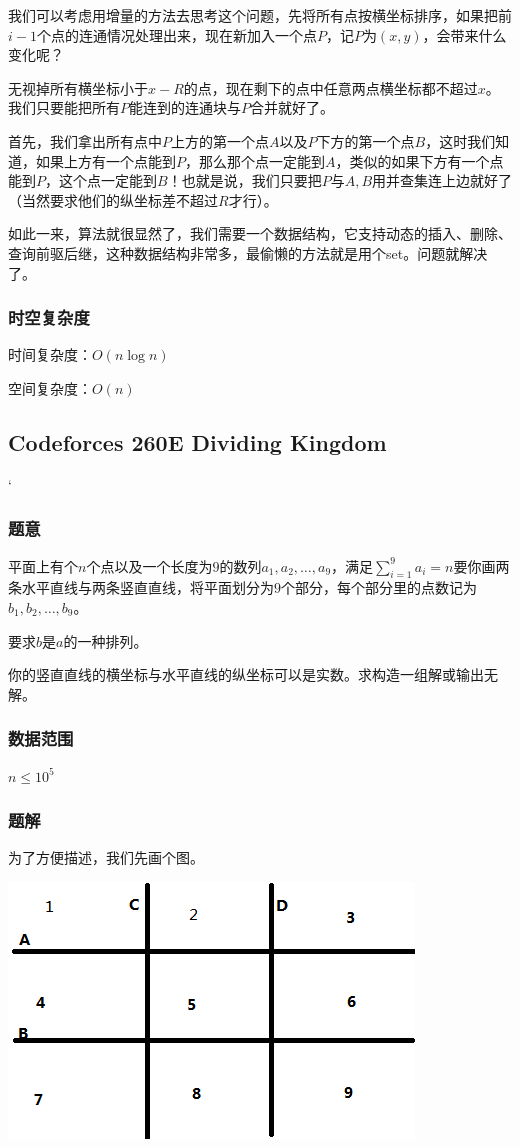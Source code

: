 \documentclass{ctexart}
\begin{document}
我们可以考虑用增量的方法去思考这个问题，先将所有点按横坐标排序，如果把前$i-1$个点的连通情况处理出来，现在新加入一个点$P$，记$P$为$(x,y)$，会带来什么变化呢？

无视掉所有横坐标小于$x-R$的点，现在剩下的点中任意两点横坐标都不超过$x$。我们只要能把所有$P$能连到的连通块与$P$合并就好了。

首先，我们拿出所有点中$P$上方的第一个点$A$以及$P$下方的第一个点$B$，这时我们知道，如果上方有一个点能到$P$，那么那个点一定能到$A$，类似的如果下方有一个点能到$P$，这个点一定能到$B$！也就是说，我们只要把$P$与$A,B$用并查集连上边就好了（当然要求他们的纵坐标差不超过$R$才行）。

如此一来，算法就很显然了，我们需要一个数据结构，它支持动态的插入、删除、查询前驱后继，这种数据结构非常多，最偷懒的方法就是用个set。问题就解决了。
\subsubsection{时空复杂度}
时间复杂度：$O(n \log n)$

空间复杂度：$O(n)$
\subsection{Codeforces 260E Dividing Kingdom}`
\subsubsection{题意}
平面上有个$n$个点以及一个长度为$9$的数列$a_1,a_2,\ldots,a_9$，满足$\sum\limits_{i=1}^9 a_i=n$要你画两条水平直线与两条竖直直线，将平面划分为$9$个部分，每个部分里的点数记为$b_1,b_2,\ldots,b_9$。

要求$b$是$a$的一种排列。

你的竖直直线的横坐标与水平直线的纵坐标可以是实数。求构造一组解或输出无解。
\subsubsection{数据范围}
$n \le 10^5$
\subsubsection{题解}
为了方便描述，我们先画个图。

\includegraphics{divi.png}
\end{document}
